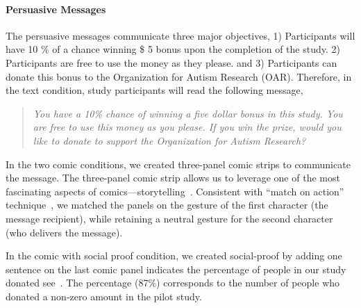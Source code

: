 \paragraph{Persuasive Messages}
The persuasive messages communicate three major objectives, 1) Participants will have 10 \% of a chance winning \$ 5 bonus upon the completion of the study. 2) Participants are free to use the money as they please. and 3) Participants can donate this bonus to the Organization for Autism Research (OAR). Therefore, in the text condition, study participants will read the following message,
\begin{quote}
  \textit{You have a 10\% chance of winning a five dollar bonus in this study. You are free to use this money as you please. If you win the prize, would you like to donate to support the Organization for Autism Research?}
\end{quote}
In the two comic conditions, we created three-panel comic strips to communicate the message. The three-panel comic strip allows us to leverage one of the most fascinating aspects of comics---storytelling~\cite{scott1993understanding}. 
Consistent with ``match on action'' technique~\cite{scott1993understanding}, we matched the panels on the gesture of the first character (the message recipient), while retaining a neutral gesture for the second character (who delivers the message). 



In the comic with social proof condition, we created social-proof by adding one sentence on the last comic panel indicates the percentage of people in our study donated see~. The percentage (87\%) corresponds to the number of people who donated a non-zero amount in the pilot study.



